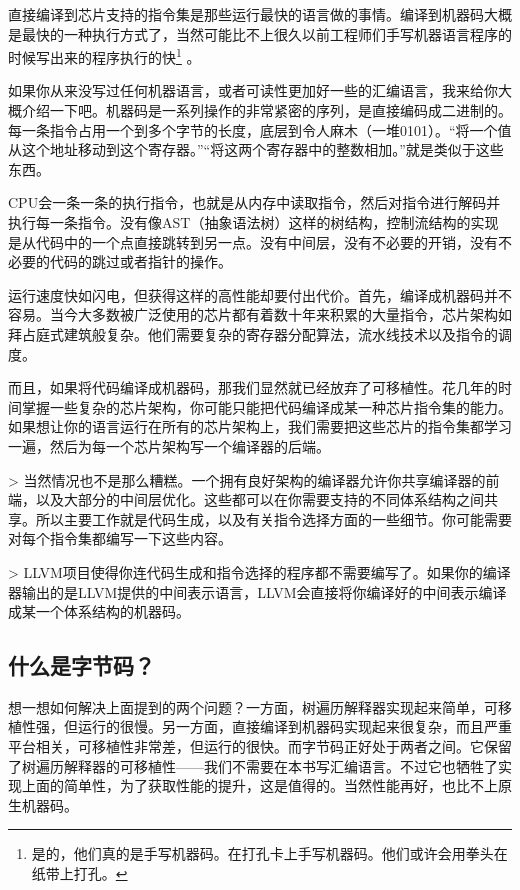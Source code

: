 \documentclass[cn,10pt,math=newtx,citestyle=gb7714-2015,bibstyle=gb7714-2015]{elegantbook}
\begin{document}
直接编译到芯片支持的指令集是那些运行最快的语言做的事情。编译到机器码大概是最快的一种执行方式了，当然可能比不上很久以前工程师们手写机器语言程序的时候写出来的程序执行的快\footnote{是的，他们真的是手写机器码。在打孔卡上手写机器码。他们或许会用拳头在纸带上打孔。} 。

如果你从来没写过任何机器语言，或者可读性更加好一些的汇编语言，我来给你大概介绍一下吧。机器码是一系列操作的非常紧密的序列，是直接编码成二进制的。每一条指令占用一个到多个字节的长度，底层到令人麻木（一堆0101）。“将一个值从这个地址移动到这个寄存器。”“将这两个寄存器中的整数相加。”就是类似于这些东西。

CPU会一条一条的执行指令，也就是从内存中读取指令，然后对指令进行解码并执行每一条指令。没有像AST（抽象语法树）这样的树结构，控制流结构的实现是从代码中的一个点直接跳转到另一点。没有中间层，没有不必要的开销，没有不必要的代码的跳过或者指针的操作。

运行速度快如闪电，但获得这样的高性能却要付出代价。首先，编译成机器码并不容易。当今大多数被广泛使用的芯片都有着数十年来积累的大量指令，芯片架构如拜占庭式建筑般复杂。他们需要复杂的寄存器分配算法，流水线技术以及指令的调度。

而且，如果将代码编译成机器码，那我们显然就已经放弃了可移植性。花几年的时间掌握一些复杂的芯片架构，你可能只能把代码编译成某一种芯片指令集的能力。如果想让你的语言运行在所有的芯片架构上，我们需要把这些芯片的指令集都学习一遍，然后为每一个芯片架构写一个编译器的后端。

> 当然情况也不是那么糟糕。一个拥有良好架构的编译器允许你共享编译器的前端，以及大部分的中间层优化。这些都可以在你需要支持的不同体系结构之间共享。所以主要工作就是代码生成，以及有关指令选择方面的一些细节。你可能需要对每个指令集都编写一下这些内容。

> LLVM项目使得你连代码生成和指令选择的程序都不需要编写了。如果你的编译器输出的是LLVM提供的中间表示语言，LLVM会直接将你编译好的中间表示编译成某一个体系结构的机器码。

\subsection{什么是字节码？}

想一想如何解决上面提到的两个问题？一方面，树遍历解释器实现起来简单，可移植性强，但运行的很慢。另一方面，直接编译到机器码实现起来很复杂，而且严重平台相关，可移植性非常差，但运行的很快。而字节码正好处于两者之间。它保留了树遍历解释器的可移植性——我们不需要在本书写汇编语言。不过它也牺牲了实现上面的简单性，为了获取性能的提升，这是值得的。当然性能再好，也比不上原生机器码。
\end{document}
